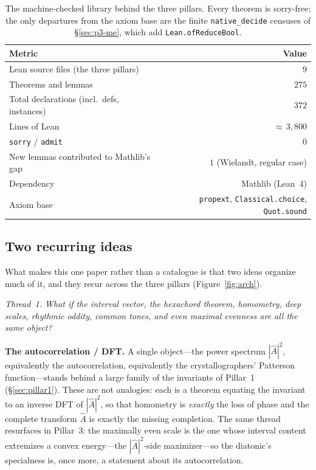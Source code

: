 \documentclass[11pt]{article}
\newcommand{\lean}[1]{\texttt{#1}}
\newcommand{\Ahat}{\hat{A}}
\newcommand{\question}[1]{\smallskip\noindent\textit{#1}\smallskip}
\begin{document}
\begin{table}[H]
\centering\small
{}
\begin{tabular}{@{}l r@{}}
\toprule
\rowcolor{ctA!22}
\textbf{Metric} & \textbf{Value}\\
\midrule
Lean source files (the three pillars) & $9$\\
Theorems and lemmas & $275$\\
Total declarations (incl.\ defs, instances) & $372$\\
Lines of Lean & ${\approx}\,3{,}800$\\
\lean{sorry} / \lean{admit} & $0$\\
New lemmas contributed to Mathlib's gap & $1$ (Wielandt, regular case)\\
Dependency & Mathlib (Lean~4)\\
Axiom base & \texttt{propext}, \texttt{Classical.choice}, \texttt{Quot.sound}\\
\bottomrule
\end{tabular}
\caption{The machine-checked library behind the three pillars. Every theorem is sorry-free; the
only departures from the axiom base are the finite \lean{native\_decide} censuses of
\S\ref{sec:p3-me}, which add \lean{Lean.ofReduceBool}.}
\label{tab:metrics}
\end{table}

\subsection{Two recurring ideas}\label{sec:intro-threads}

What makes this one paper rather than a catalogue is that two ideas organize much of it, and
they recur across the three pillars (Figure~\ref{fig:arch}).

\question{Thread~1. What if the interval vector, the hexachord theorem, homometry, deep scales,
rhythmic oddity, common tones, and even maximal evenness are all the same object?}

\noindent\textbf{The autocorrelation / DFT.} A single object---the power spectrum $|\Ahat|^2$,
equivalently the autocorrelation, equivalently the crystallographers' Patterson
function---stands behind a large family of the invariants of Pillar~1 (\S\ref{sec:pillar1}).
These are not analogies: each is a theorem equating the invariant to an inverse DFT of
$|\Ahat|^2$, so that
homometry is \emph{exactly} the loss of phase and the complete transform $\Ahat$ is exactly the
missing completion. The same thread resurfaces in Pillar~3: the maximally even scale is the one
whose interval content extremizes a convex energy---the $|\Ahat|^2$-side maximizer---so the
diatonic's specialness is, once more, a statement about its autocorrelation.
\end{document}
